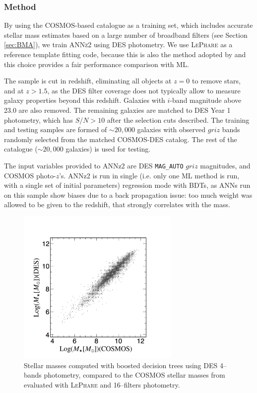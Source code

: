 \subsubsection{Method}
By using the \citet{laigle} COSMOS-based catalogue as a training set, which includes accurate stellar mass estimates based on a large number of broadband filters (see Section \ref{sec:BMA}), we train \textsc{ANNz2} using DES photometry. We use \textsc{LePhare} as a reference template fitting code, because this is also the method adopted by \citet{laigle} and this choice provides a fair performance comparison with ML.

The sample is cut in redshift, eliminating all objects at $z=0$ to remove stars, and at $z>1.5$, as the DES filter coverage does not typically allow to measure galaxy properties beyond this redshift. Galaxies with  $i$-band  magnitude above 23.0 are also removed. The remaining galaxies are matched to DES Year 1 photometry, which has $S/N>10$ after the selection cuts described. The training and testing samples are formed of $\sim 20,000$ galaxies with observed $griz$ bands randomly selected from the matched COSMOS-DES catalog. The rest of the catalogue ($\sim 20,000$ galaxies) is used for testing. 

The input variables provided to ANNz2 are DES \texttt{MAG\_AUTO} $griz$ magnitudes, and COSMOS photo-$z$'s. ANNz2 is run in single (i.e. only one ML method is run, with a single set of initial parameters) regression mode with BDTs, as ANNs run on this sample show biases due to a back propagation  issue: too much weight was allowed to be given to the redshift, that strongly correlates with the mass. %

\begin{figure}\centering \includegraphics[width=0.7\textwidth]{./chapters/chapter2/figs/corRegTrgZ_ANNZ_best_MGcnvs.jpg}\caption{Stellar masses computed with boosted decision trees using DES 4--bands photometry, compared to the COSMOS stellar masses from \citet{laigle} evaluated with \textsc{LePhare} and 16--filters photometry.}\label{fig:m_vs_m_bdt}\end{figure}

